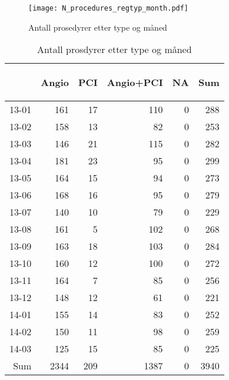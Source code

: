 \documentclass[presentation,xcolor=pdftex,dvipsnames,table]{beamer}
\begin{document}
\begin{frame}
\begin{figure}
  \centering
  \caption{Antall prosedyrer etter type og måned}
\texttt{[image: N\_procedures\_regtyp\_month.pdf]}
\end{figure}\end{frame}

\begin{frame}
\begin{tiny}
\begin{table}[ht]
\centering
\begin{tabular}{rrrrrr}
  \toprule
 & \begin{sideways} Angio \end{sideways} & \begin{sideways} PCI \end{sideways} & \begin{sideways} Angio+PCI \end{sideways} & \begin{sideways} NA \end{sideways} & \begin{sideways} Sum \end{sideways} \\ 
  \midrule
13-01 & 161 & 17 & 110 & 0 & 288 \\ 
  13-02 & 158 & 13 & 82 & 0 & 253 \\ 
  13-03 & 146 & 21 & 115 & 0 & 282 \\ 
  13-04 & 181 & 23 & 95 & 0 & 299 \\ 
  13-05 & 164 & 15 & 94 & 0 & 273 \\ 
  13-06 & 168 & 16 & 95 & 0 & 279 \\ 
  13-07 & 140 & 10 & 79 & 0 & 229 \\ 
  13-08 & 161 & 5 & 102 & 0 & 268 \\ 
  13-09 & 163 & 18 & 103 & 0 & 284 \\ 
  13-10 & 160 & 12 & 100 & 0 & 272 \\ 
  13-11 & 164 & 7 & 85 & 0 & 256 \\ 
  13-12 & 148 & 12 & 61 & 0 & 221 \\ 
  14-01 & 155 & 14 & 83 & 0 & 252 \\ 
  14-02 & 150 & 11 & 98 & 0 & 259 \\ 
  14-03 & 125 & 15 & 85 & 0 & 225 \\ 
  Sum & 2344 & 209 & 1387 & 0 & 3940 \\ 
   \bottomrule
\end{tabular}
\caption{Antall prosdyrer etter type og måned} 
\end{table}\end{tiny}
\end{frame}
\end{document}
